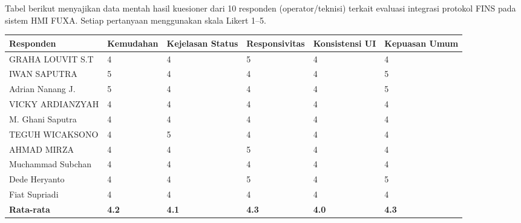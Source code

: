 Tabel berikut menyajikan data mentah hasil kuesioner dari 10 responden (operator/teknisi) terkait evaluasi integrasi protokol FINS pada sistem HMI FUXA. Setiap pertanyaan menggunakan skala Likert 1--5.

\begin{table}[H]
\centering
\begin{tabular}{|p{3cm}|p{2.2cm}|p{2cm}|p{2.4cm}|p{2.2cm}|p{2cm}|}
\hline
\textbf{Responden} & \textbf{Kemudahan} & \textbf{Kejelasan Status} & \textbf{Responsivitas} & \textbf{Konsistensi UI} & \textbf{Kepuasan Umum} \\ \hline
GRAHA LOUVIT S.T & 4 & 4 & 5 & 4 & 4 \\ \hline
IWAN SAPUTRA & 5 & 4 & 4 & 4 & 5 \\ \hline
Adrian Nanang J. & 5 & 4 & 4 & 4 & 5 \\ \hline
VICKY ARDIANZYAH & 4 & 4 & 4 & 4 & 4 \\ \hline
M. Ghani Saputra & 4 & 4 & 4 & 4 & 4 \\ \hline
TEGUH WICAKSONO & 4 & 5 & 4 & 4 & 4 \\ \hline
AHMAD MIRZA & 4 & 4 & 5 & 4 & 4 \\ \hline
Muchammad Subchan & 4 & 4 & 4 & 4 & 4 \\ \hline
Dede Heryanto & 4 & 4 & 5 & 4 & 5 \\ \hline
Fiat Supriadi & 4 & 4 & 4 & 4 & 4 \\ \hline

\textbf{Rata-rata} & \textbf{4.2} & \textbf{4.1} & \textbf{4.3} & \textbf{4.0} & \textbf{4.3} \\ \hline
\end{tabular}
\label{lampiran:tabulasi-responden}
\end{table}